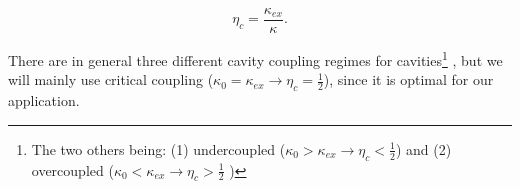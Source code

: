 \begin{equation}
\eta_c = \frac{\kappa_{ex}}{\kappa}.
\end{equation}

There are in general three different cavity coupling regimes for cavities\footnote{The two others being: (1) undercoupled ($\kappa_0 > \kappa_{ex} \rightarrow \eta_c < \frac{1}{2}$) and (2) overcoupled ($\kappa_0 < \kappa_{ex} \rightarrow \eta_c > \frac{1}{2}$ )} \cite{schliesser2009}, but we will mainly use critical coupling ($\kappa_0 = \kappa_{ex} \rightarrow \eta_c = \frac{1}{2}$), since it is optimal for our application.

